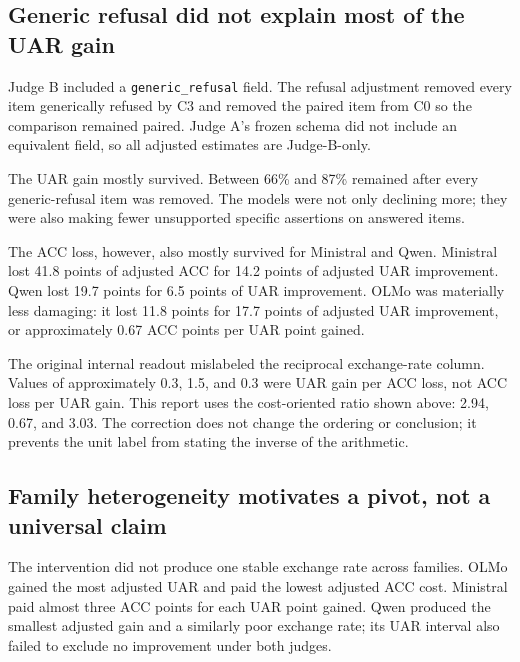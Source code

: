 \documentclass[9pt,letterpaper,twocolumn]{extarticle}
\begin{document}
\subsection{Generic refusal did not explain most of the UAR
gain}\label{generic-refusal-did-not-explain-most-of-the-uar-gain}

Judge B included a \texttt{generic\_refusal} field. The refusal
adjustment removed every item generically refused by C3 and removed the
paired item from C0 so the comparison remained paired. Judge A's frozen
schema did not include an equivalent field, so all adjusted estimates
are Judge-B-only.



The UAR gain mostly survived. Between 66\% and 87\% remained after every
generic-refusal item was removed. The models were not only declining
more; they were also making fewer unsupported specific assertions on
answered items.

The ACC loss, however, also mostly survived for Ministral and Qwen.
Ministral lost 41.8 points of adjusted ACC for 14.2 points of adjusted
UAR improvement. Qwen lost 19.7 points for 6.5 points of UAR
improvement. OLMo was materially less damaging: it lost 11.8 points for
17.7 points of adjusted UAR improvement, or approximately 0.67 ACC
points per UAR point gained.



The original internal readout mislabeled the reciprocal exchange-rate
column. Values of approximately 0.3, 1.5, and 0.3 were UAR gain per ACC
loss, not ACC loss per UAR gain. This report uses the cost-oriented
ratio shown above: 2.94, 0.67, and 3.03. The correction does not change
the ordering or conclusion; it prevents the unit label from stating the
inverse of the arithmetic.

\subsection{Family heterogeneity motivates a pivot, not a universal
claim}\label{family-heterogeneity-motivates-a-pivot-not-a-universal-claim}

The intervention did not produce one stable exchange rate across
families. OLMo gained the most adjusted UAR and paid the lowest adjusted
ACC cost. Ministral paid almost three ACC points for each UAR point
gained. Qwen produced the smallest adjusted gain and a similarly poor
exchange rate; its UAR interval also failed to exclude no improvement
under both judges.
\end{document}
